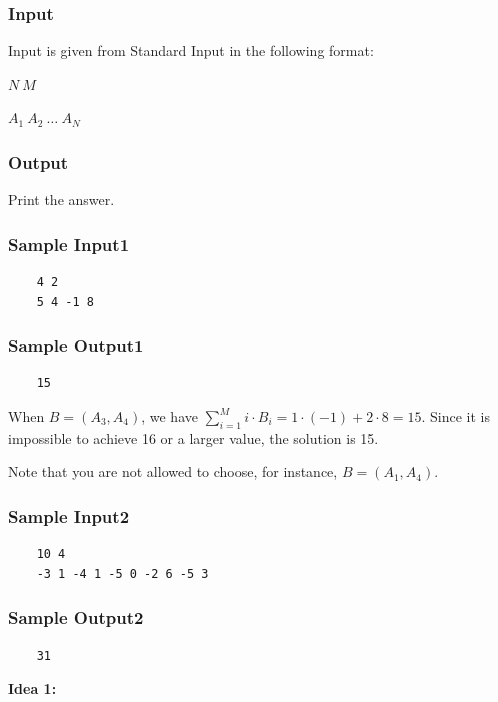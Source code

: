 \subsubsection*{Input}

Input is given from Standard Input in the following format:

$N\ M$  

$A_1\ A_2\ \dots\ A_N$

\subsubsection*{Output}
Print the answer.

\subsubsection*{Sample Input1}
\begin{verbatim}
	4 2
	5 4 -1 8
\end{verbatim}

\subsubsection*{Sample Output1}
\begin{verbatim}
	15
\end{verbatim}


\vspace{0.5cm}

When $B=(A_3,A_4)$, we have $\sum_{i=1}^{M} i\cdot B_i=1\cdot(-1)+2\cdot8=15$. Since it is impossible to achieve 
16 or a larger value, the solution is 
15.

Note that you are not allowed to choose, for instance, 
$B=(A_1, A_4)$.

\subsubsection*{Sample Input2}

\begin{verbatim}
	10 4
	-3 1 -4 1 -5 0 -2 6 -5 3
\end{verbatim}

\subsubsection*{Sample Output2}
\begin{verbatim}
	31
\end{verbatim}


\bigskip
\noindent \textbf{Idea 1:} 

